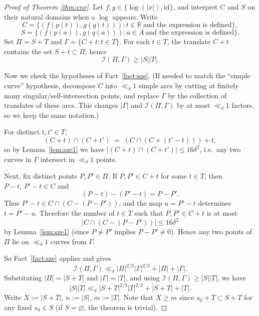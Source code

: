 \documentclass[12pt,reqno]{amsart}
\numberwithin{equation}{section}
\begin{document}
\begin{proof}[Proof of Theorem \ref{thm:enr}]
Let \( f,g \in \{\log(|x|), \mathrm{id}\} \), and interpret \(C\) and \(S\) on their natural domains when a \(\log\) appears.
Write
\[
C=\{(f(p(t)),g(q(t))): t\in \mathbb R \ \text{and the expression is defined}\},\]
\[
S=\{(f(p(a)),g(q(a))): a\in A \ \text{and the expression is defined}\}.
\]
Set \( \Pi = S + T \) and \( \Gamma = \{C + t : t \in T\} \). For each \(t\in T\), the translate \(C+t\) contains the set \(S+t\subset \Pi\), hence
\[
\mathcal I(\Pi,\Gamma)\ge |S||T|.
\]

Now we check the hypotheses of Fact~\ref{fact:sze}. (If needed to match the ``simple curve'' hypothesis, decompose \(C\) into \(\ll_\delta 1\) simple arcs by cutting at finitely many singular/self-intersection points, and replace \(\Gamma\) by the collection of translates of these arcs. This changes \(|\Gamma|\) and \(\mathcal I(\Pi,\Gamma)\) by at most \(\ll_\delta 1\) factors, so we keep the same notation.)

For distinct \(t,t'\in T\),
\[
(C+t)\cap(C+t') \;=\; (C\cap (C+(t'-t)))+t,
\]
so by Lemma~\ref{lem:sze1} we have \(|(C+t)\cap(C+t')|\le 16\delta^2\), i.e.\ any two curves in \(\Gamma\) intersect in \(\ll_\delta 1\) points.

Next, fix distinct points \(P,P'\in \Pi\). If \(P,P'\in C+t\) for some \(t\in T\), then \(P-t,\,P'-t\in C\) and
\[
(P-t)-(P'-t)=P-P'.
\]
Thus \(P'-t \in C\cap (C-(P-P'))\), and the map \(u=P'-t\) determines \(t=P'-u\). Therefore the number of \(t\in T\) such that \(P,P'\in C+t\) is at most
\[
|C\cap (C-(P-P'))|\le 16\delta^2
\]
by Lemma~\ref{lem:sze1} (since \(P\neq P'\) implies \(P-P'\neq 0\)).
Hence any two points of \(\Pi\) lie on \(\ll_\delta 1\) curves from \(\Gamma\).

So Fact~\ref{fact:sze} applies and gives
\begin{equation}\label{eq:inc-bound}
\mathcal{I}(\Pi, \Gamma) \ll_{\delta }|\Pi|^{2 / 3}|\Gamma|^{2 / 3}+|\Pi|+|\Gamma|.
\end{equation}
Substituting \( |\Pi| = |S+T| \) and \( |\Gamma| = |T| \), and using \(\mathcal I(\Pi,\Gamma)\ge |S||T|\), we have
\begin{equation}\label{eq:main-ineq}
|S||T| \ll_{\delta} |S+T|^{2/3}|T|^{2/3} + |S+T| + |T|.
\end{equation}
Write \(X:=|S+T|\), \(n:=|S|\), \(m:=|T|\).
Note that \(X\ge m\) since \(s_0+T\subset S+T\) for any fixed \(s_0\in S\) (if \(S=\varnothing\), the theorem is trivial).


\end{proof}
\end{document}
